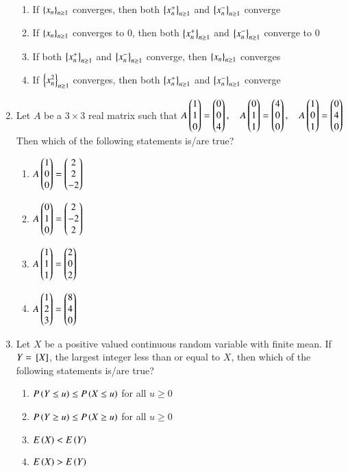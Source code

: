 \documentclass[journal,12pt,onecolumn]{IEEEtran}
\theoremstyle{remark}
\begin{document}
\begin{enumerate}
\begin{enumerate}
\item If $\left\{x_n\right\}_{n\ge1}$ converges, then both $\left\{x_n^+\right\}_{n\ge1}$ and $\left\{x_n^-\right\}_{n\ge1}$ converge
\item If $\left\{x_n\right\}_{n\ge1}$ converges to $0$, then both $\left\{x_n^+\right\}_{n\ge1}$ and $\left\{x_n^-\right\}_{n\ge1}$ converge to $0$
\item If both $\left\{x_n^+\right\}_{n\ge1}$ and $\left\{x_n^-\right\}_{n\ge1}$ converge, then $\left\{x_n\right\}_{n\ge1}$ converges
\item If $\left\{x_n^2\right\}_{n\ge1}$ converges, then both $\left\{x_n^+\right\}_{n\ge1}$ and $\left\{x_n^-\right\}_{n\ge1}$ converge
\end{enumerate}
\item Let $A$ be a $3\times3$ real matrix such that 
$A\begin{pmatrix}1\\1\\0\end{pmatrix} = \begin{pmatrix}0\\0\\4\end{pmatrix}, \quad A\begin{pmatrix}0\\1\\1\end{pmatrix} = \begin{pmatrix}4\\0\\0\end{pmatrix}, \quad A\begin{pmatrix}1\\0\\1\end{pmatrix} = \begin{pmatrix}0\\4\\0\end{pmatrix}$
Then which of the following statements is/are true?

\begin{enumerate}
\item $A\begin{pmatrix}1\\0\\0\end{pmatrix} = \begin{pmatrix}2\\2\\-2\end{pmatrix}$
\item $A\begin{pmatrix}0\\1\\0\end{pmatrix} = \begin{pmatrix}2\\-2\\2\end{pmatrix}$
\item $A\begin{pmatrix}1\\1\\1\end{pmatrix} = \begin{pmatrix}2\\0\\2\end{pmatrix}$
\item $A\begin{pmatrix}1\\2\\3\end{pmatrix} = \begin{pmatrix}8\\4\\0\end{pmatrix}$
\end{enumerate}
\item Let $X$ be a positive valued continuous random variable with finite mean.
      If $Y = {}\left[X\right]$, the largest integer less than or equal to $X$, then which of the
      following statements is/are true?

\begin{enumerate}
\item $P\left(Y \leq u\right) \leq P\left(X \leq u\right)$ for all $u \geq 0$
\item $P\left(Y \geq u\right) \leq P\left(X \geq u\right)$ for all $u \geq 0$
\item $E\left(X\right) < E\left(Y\right)$
\item $E\left(X\right) > E\left(Y\right)$
\end{enumerate}
\end{enumerate}
\end{document}
